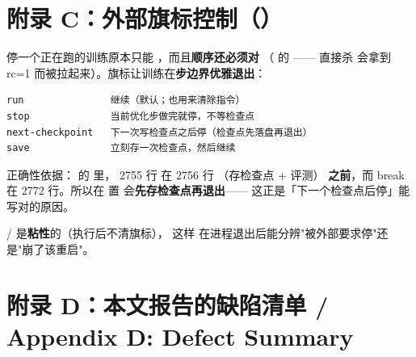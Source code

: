 \documentclass[11pt,openany]{ctexart}
\begin{document}
\section{附录 C：外部旗标控制（）}

停一个正在跑的训练原本只能 ，而且\textbf{顺序还必须对} （ 的 —— 直接杀  会拿到 rc=1 而被拉起来）。旗标让训练在\textbf{步边界优雅退出}：

\begin{lstlisting}[]
run               继续（默认；也用来清除指令）
stop              当前优化步做完就停，不等检查点
next-checkpoint   下一次写检查点之后停（检查点先落盘再退出）
save              立刻存一次检查点，然后继续
\end{lstlisting}

正确性依据： 的  里， 2755 行  在 2756 行 （存检查点 + 评测） \textbf{之前}，而 break 在 2772 行。所以在  置  会\textbf{先存检查点再退出}—— 这正是「下一个检查点后停」能写对的原因。

 /  是\textbf{粘性}的（执行后不清旗标）， 这样  在进程退出后能分辨"被外部要求停"还是"崩了该重启"。

\reportrule

\section{附录 D：本文报告的缺陷清单 / Appendix D: Defect Summary}
\end{document}
